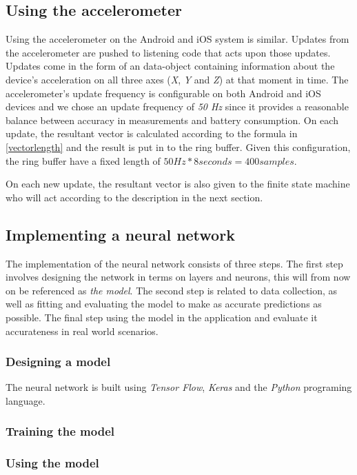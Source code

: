 \documentclass[12pt, a4paper, onecolumn]{article}
\begin{document}
		\subsection{Using the accelerometer}
			Using the accelerometer on the Android and iOS system is similar. Updates from the accelerometer are pushed to listening code that acts upon those updates. Updates come in the form of an data-object containing information about the device's acceleration on all three axes (\textit{X}, \textit{Y} and \textit{Z}) at that moment in time. The accelerometer's update frequency is configurable on both Android and iOS devices and we chose an update frequency of \textit{50 Hz} since it provides a reasonable balance between accuracy in measurements and battery consumption. On each update, the resultant vector is calculated according to the formula in \ref{vectorlength} and the result is put in to the ring buffer. Given this configuration, the ring buffer have a fixed length of \(50 Hz * 8 seconds = 400 samples\). 
			
			On each new update, the resultant vector is also given to the finite state machine who will act according to the description in the next section.
	

		\subsection{Implementing a neural network}
			The implementation of the neural network consists of three steps. The first step involves designing the network in terms on layers and neurons, this will from now on be referenced as \textit{the model}. The second step is related to data collection, as well as fitting and evaluating the model to make as accurate predictions as possible. The final step using the model in the application and evaluate it accurateness in real world scenarios. 

		\subsubsection{Designing a model}
			The neural network is built using \textit{Tensor Flow}, \textit{Keras} and the \textit{Python} programing language. 

		\subsubsection{Training the model}

		\subsubsection{Using the model}



\end{document}
